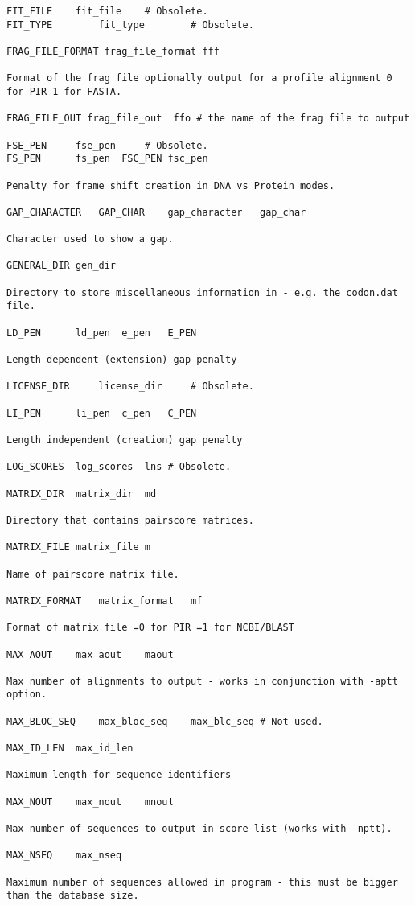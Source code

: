 \documentclass[12pt]{article}
\begin{document}
\begin{scriptsize}
\begin{verbatim}
FIT_FILE	fit_file	# Obsolete.
FIT_TYPE        fit_type        # Obsolete.

FRAG_FILE_FORMAT frag_file_format fff 

Format of the frag file optionally output for a profile alignment 0
for PIR 1 for FASTA.

FRAG_FILE_OUT frag_file_out  ffo # the name of the frag file to output

FSE_PEN		fse_pen		# Obsolete.
FS_PEN		fs_pen	FSC_PEN	fsc_pen	

Penalty for frame shift creation in DNA vs Protein modes.

GAP_CHARACTER	GAP_CHAR	gap_character	gap_char

Character used to show a gap.

GENERAL_DIR	gen_dir		

Directory to store miscellaneous information in - e.g. the codon.dat file.

LD_PEN		ld_pen	e_pen	E_PEN		

Length dependent (extension) gap penalty

LICENSE_DIR     license_dir     # Obsolete.

LI_PEN		li_pen	c_pen	C_PEN

Length independent (creation) gap penalty

LOG_SCORES	log_scores	lns	# Obsolete.

MATRIX_DIR	matrix_dir	md 

Directory that contains pairscore matrices.

MATRIX_FILE	matrix_file m	

Name of pairscore matrix file.

MATRIX_FORMAT	matrix_format	mf	

Format of matrix file =0 for PIR =1 for NCBI/BLAST

MAX_AOUT	max_aout	maout	

Max number of alignments to output - works in conjunction with -aptt option.

MAX_BLOC_SEQ	max_bloc_seq	max_blc_seq	# Not used.

MAX_ID_LEN	max_id_len	

Maximum length for sequence identifiers

MAX_NOUT	max_nout	mnout	

Max number of sequences to output in score list (works with -nptt).

MAX_NSEQ	max_nseq	

Maximum number of sequences allowed in program - this must be bigger than the database size.


\end{verbatim}
\end{scriptsize}
\end{document}

